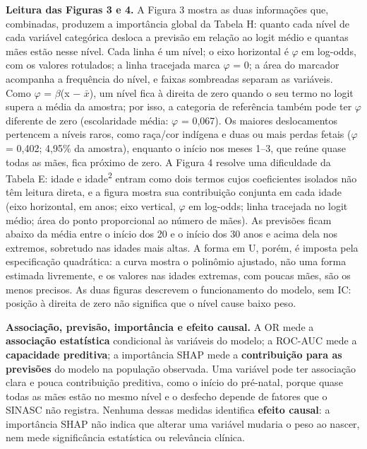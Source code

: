 \documentclass[10pt,a4paper]{article}
\newcommand{\menos}{\ensuremath{-}}
\begin{document}
{\color{iptescuro}\bfseries Leitura das Figuras 3 e 4.} A Figura 3 mostra as duas informações que, combinadas, produzem a importância global da Tabela H: quanto cada nível de cada variável categórica desloca a previsão em relação ao logit médio e quantas mães estão nesse nível. Cada linha é um nível; o eixo horizontal é \ensuremath{\varphi} em log-odds, com os valores rotulados; a linha tracejada marca \ensuremath{\varphi} = 0; a área do marcador acompanha a frequência do nível, e faixas sombreadas separam as variáveis. Como \ensuremath{\varphi} = \ensuremath{\beta}(x \menos{} \ensuremath{\bar x}), um nível fica à direita de zero quando o seu termo no logit supera a média da amostra; por isso, a categoria de referência também pode ter \ensuremath{\varphi} diferente de zero (escolaridade média: \ensuremath{\varphi} = 0,067). Os maiores deslocamentos pertencem a níveis raros, como raça/cor indígena e duas ou mais perdas fetais (\ensuremath{\varphi} = 0,402; 4,95\% da amostra), enquanto o início nos meses 1--3, que reúne quase todas as mães, fica próximo de zero. A Figura 4 resolve uma dificuldade da Tabela E: idade e idade\textsuperscript{2} entram como dois termos cujos coeficientes isolados não têm leitura direta, e a figura mostra sua contribuição conjunta em cada idade (eixo horizontal, em anos; eixo vertical, \ensuremath{\varphi} em log-odds; linha tracejada no logit médio; área do ponto proporcional ao número de mães). As previsões ficam abaixo da média entre o início dos 20 e o início dos 30 anos e acima dela nos extremos, sobretudo nas idades mais altas. A forma em U, porém, é imposta pela especificação quadrática: a curva mostra o polinômio ajustado, não uma forma estimada livremente, e os valores nas idades extremas, com poucas mães, são os menos precisos. As duas figuras descrevem o funcionamento do modelo, sem IC: posição à direita de zero não significa que o nível cause baixo peso.\par

\begin{caixa}{\color{iptescuro}\bfseries Associação, previsão, importância e efeito causal.} A OR mede a \textbf{associação estatística} condicional às variáveis do modelo; a ROC-AUC mede a \textbf{capacidade preditiva}; a importância SHAP mede a \textbf{contribuição para as previsões} do modelo na população observada. Uma variável pode ter associação clara e pouca contribuição preditiva, como o início do pré-natal, porque quase todas as mães estão no mesmo nível e o desfecho depende de fatores que o SINASC não registra. Nenhuma dessas medidas identifica \textbf{efeito causal}: a importância SHAP não indica que alterar uma variável mudaria o peso ao nascer, nem mede significância estatística ou relevância clínica.\end{caixa}
\end{document}
